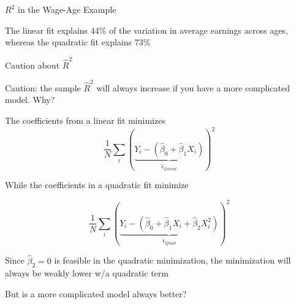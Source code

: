 \documentclass[11pt,english,handout]{beamer}
\newenvironment{wideitemize}{\itemize\addtolength{\itemsep}{10pt}}{\enditemize}
\begin{document}
\begin{frame}{$R^2$ in the Wage-Age Example}
	\begin{figure}
		  
	\end{figure}
	
	\begin{wideitemize}
		\item
		The linear fit explains 44\% of the variation in average earnings across ages, whereas the quadratic fit explains 73\%
	\end{wideitemize}
\end{frame}


\begin{frame}{Caution about $\hat{R}^2$}
	\begin{wideitemize}
		\item
		Caution: the sample $\hat{R}^2$ will always increase if you have a more complicated model. Why? 
		
		\pause
		\item
		The coefficients from a linear fit minimizes 
		$$ \frac{1}{N} \sum_i (\underbrace{Y_i - (\hat\beta_0 + \hat\beta_1 X_i)}_{\hat\epsilon_{Linear}})^2 $$
		
		While the coefficients in a quadratic fit minimize
		
		$$ \frac{1}{N} \sum_i (\underbrace{Y_i - (\hat\beta_0 + \hat\beta_1 X_i + \hat\beta_2 X_i^2)}_{\hat\epsilon_{Quad}})^2 $$
		
		\noindent Since $\hat\beta_2 = 0$ is feasible in the quadratic minimization, the minimization will always be weakly lower w/a quadratic term
		
		
		\pause
		\item
		But is a more complicated model always better?
	\end{wideitemize}
\end{frame}
\end{document}
